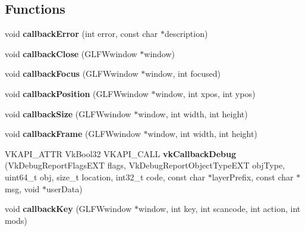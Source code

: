 \subsection*{Functions}
\begin{DoxyCompactItemize}
\item 
\mbox{\label{namespaceflounder_ad7d35bbad7a6d0899ac9e3c0995d647b}} 
void {\bfseries callback\+Error} (int error, const char $\ast$description)
\item 
\mbox{\label{namespaceflounder_acc0f360793fc7aaadd19091c3f1ffafa}} 
void {\bfseries callback\+Close} (G\+L\+F\+Wwindow $\ast$window)
\item 
\mbox{\label{namespaceflounder_a1d6065cc47084937a4d2673ab12844f0}} 
void {\bfseries callback\+Focus} (G\+L\+F\+Wwindow $\ast$window, int focused)
\item 
\mbox{\label{namespaceflounder_a390037dac78dfbe22628a15e16fa3ce8}} 
void {\bfseries callback\+Position} (G\+L\+F\+Wwindow $\ast$window, int xpos, int ypos)
\item 
\mbox{\label{namespaceflounder_ac2c6a4e443858e377538ac4a4bb357b0}} 
void {\bfseries callback\+Size} (G\+L\+F\+Wwindow $\ast$window, int width, int height)
\item 
\mbox{\label{namespaceflounder_a8a1582884f2eb56eff1033920ed90bb8}} 
void {\bfseries callback\+Frame} (G\+L\+F\+Wwindow $\ast$window, int width, int height)
\item 
\mbox{\label{namespaceflounder_a2e4316bcd1a055b9b98187b5c5e2f44e}} 
V\+K\+A\+P\+I\+\_\+\+A\+T\+TR Vk\+Bool32 V\+K\+A\+P\+I\+\_\+\+C\+A\+LL {\bfseries vk\+Callback\+Debug} (Vk\+Debug\+Report\+Flags\+E\+XT flags, Vk\+Debug\+Report\+Object\+Type\+E\+XT obj\+Type, uint64\+\_\+t obj, size\+\_\+t location, int32\+\_\+t code, const char $\ast$layer\+Prefix, const char $\ast$msg, void $\ast$user\+Data)
\item 
\mbox{\label{namespaceflounder_aedc5b150f5c57785e29b1594ceeb9daf}} 
void {\bfseries callback\+Key} (G\+L\+F\+Wwindow $\ast$window, int key, int scancode, int action, int mods)

\end{DoxyCompactItemize}
